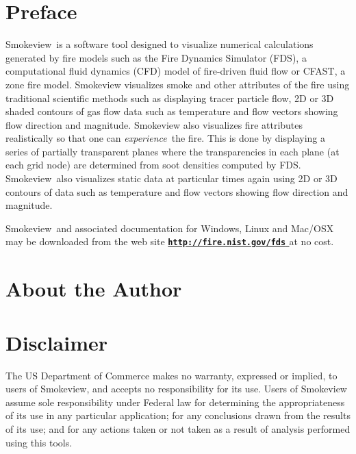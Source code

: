 \documentclass[11pt,twoside]{book}
\newcommand{\hhref}[1]{\href{#1}{{\tt #1}
}}
\newcommand{\fds}{{FDS}}
\newcommand{\Smokeview}{{Smokeview}}
\begin{document}
\chapter{Preface}
\Smokeview\ is a software tool designed to visualize numerical
calculations generated by fire models such as the Fire Dynamics Simulator (\fds),
a computational fluid dynamics (CFD) model of fire-driven fluid
flow or CFAST, a zone fire model. Smokeview visualizes smoke and other attributes of the fire
using traditional scientific methods such as displaying tracer
particle flow, 2D or 3D shaded contours of gas flow data such as
temperature and flow vectors showing flow direction and magnitude.
Smokeview also visualizes fire attributes realistically so that one can
{\em experience}\ the fire. This is done by displaying a series of
partially transparent planes where the transparencies in each
plane (at each grid node) are determined from soot densities
computed by FDS.  \Smokeview\ also visualizes static data at
particular times again using 2D or 3D contours of data such as
temperature and flow vectors showing flow direction and magnitude.

\Smokeview\ and associated
documentation for Windows, Linux and Mac/OSX may be downloaded from the web site {\bf
\hhref{http://fire.nist.gov/fds}} at no cost.


\chapter{About the Author}

\begin{description}

\end{description}


\chapter{Disclaimer}

The US Department of Commerce makes no warranty,
expressed or implied, to users of Smokeview, and accepts no
responsibility for its use. Users of Smokeview assume sole
responsibility under Federal law for determining the
appropriateness of its use in any particular application; for any
conclusions drawn from the results of its use; and for any actions
taken or not taken as a result of analysis performed using this
tools.
\end{document}
